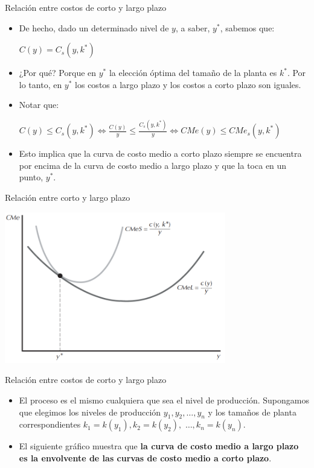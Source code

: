 \documentclass{beamer}
\theoremstyle{definition}
\begin{document}
\begin{frame}{Relaci\'on entre costos de corto y largo plazo}
\begin{itemize}
\item De hecho, dado un determinado nivel de $y$, a saber, $y^*$, sabemos que:
\begin{center}
$C(y)= C_s(y,k^*)$
\end{center}
\item ¿Por qué? Porque en $y^*$ la elección óptima del tamaño de la planta es $k^*$. Por lo tanto,
en $y^*$ los costos a largo plazo y los costos a corto plazo son iguales.
\item Notar que:
\begin{center}
$C(y)\leq C_s(y,k^*) \Leftrightarrow \frac{C(y)}{y}\leq \frac{C_s(y,k^*)}{y} \Leftrightarrow CMe(y)\leq CMe_s(y,k^*)$
\end{center}
\item Esto implica que la curva de costo medio a corto plazo siempre se encuentra por encima de la curva de costo medio a largo plazo y que la toca en un punto, $y^*$.
\end{itemize}
\end{frame}

\begin{frame}{Relaci\'on entre corto y largo plazo}
	\begin{center}
\includegraphics[width=3.8in]{figures4/shortlong1.png}
\end{center}
\end{frame}
\begin{frame}{Relaci\'on entre costos de corto y largo plazo}
\begin{itemize}
\item El proceso es el mismo cualquiera que sea el nivel de producción. Supongamos
que elegimos los niveles de producción $y_1, y_2, …, y_n$ y los tamaños de planta correspondientes $k_1 = k(y_1), k_2 = k(y_2),$ $ …, k_n = k(y_n)$. 
\item  El siguiente gr\'afico muestra que \textbf{la curva de costo medio a largo plazo es la envolvente de las curvas de costo medio a corto plazo}.
\end{itemize}
\end{frame}
\end{document}
